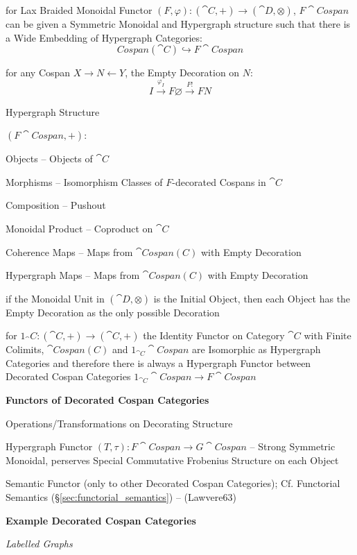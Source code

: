 for Lax Braided Monoidal Functor $(F,\varphi): (\cat{C},+) \rightarrow
(\cat{D},\otimes)$, $F\cat{Cospan}$ can be given a Symmetric Monoidal
and Hypergraph structure such that there is a Wide Embedding of
Hypergraph Categories:
\[
  Cospan(\cat{C}) \hookrightarrow F\cat{Cospan}
\]

for any Cospan $X \rightarrow N \leftarrow Y$, the Empty Decoration on
$N$:
\[
  I \xrightarrow{\varphi_I} F \varnothing \xrightarrow{F!} F N
\]


Hypergraph Structure

$(F\cat{Cospan}, +)$:

Objects -- Objects of $\cat{C}$

Morphisms -- Isomorphism Classes of $F$-decorated Cospans in $\cat{C}$

Composition -- Pushout

Monoidal Product -- Coproduct on $\cat{C}$

Coherence Maps -- Maps from $\cat{Cospan(C)}$ with Empty Decoration

Hypergraph Maps -- Maps from $\cat{Cospan(C)}$ with Empty Decoration


if the Monoidal Unit in $(\cat{D}, \otimes)$ is the Initial Object,
then each Object has the Empty Decoration as the only possible
Decoration

for $1_\cat{C} : (\cat{C}, +) \rightarrow (\cat{C}, +)$ the Identity
Functor on Category $\cat{C}$ with Finite Colimits, $\cat{Cospan(C)}$
and $1_{\cat{C}}\cat{Cospan}$ are Isomorphic as Hypergraph Categories
and therefore there is always a Hypergraph Functor between Decorated
Cospan Categories $1_{\cat{C}}\cat{Cospan} \rightarrow F\cat{Cospan}$


\textbf{Functors of Decorated Cospan Categories}


Operations/Transformations on Decorating Structure

Hypergraph Functor $(T,\tau) : F\cat{Cospan} \rightarrow
G\cat{Cospan}$ -- Strong Symmetric Monoidal, perserves Special
Commutative Frobenius Structure on each Object

Semantic Functor (only to other Decorated Cospan Categories); \fist
Cf. Functorial Semantics (\S\ref{sec:functorial_semantics}) --
(Lawvere63)


\textbf{Example Decorated Cospan Categories}


\emph{Labelled Graphs}

